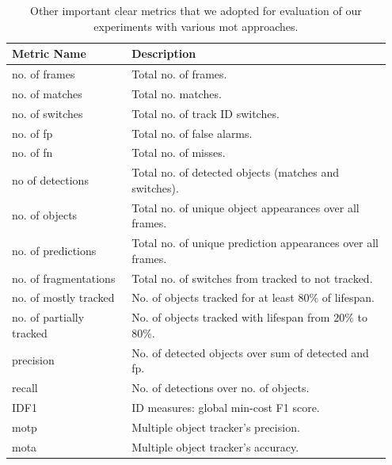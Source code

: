 \begin{table}[t]
    \centering
    \begin{tabular}{p{0.3\linewidth}p{0.65\linewidth}}
        \toprule
        \textbf{Metric Name}     & \textbf{Description}                                        \\
        \midrule
        no. of frames            & Total no. of frames.                                        \\
        no. of matches           & Total no. matches.                                          \\
        no. of switches          & Total no. of track ID switches.                             \\
        no. of \gls{fp}          & Total no. of false alarms.                                  \\
        no. of \gls{fn}          & Total no. of misses.                                        \\
        no of detections         & Total no. of detected objects (matches and switches).       \\
        no. of objects           & Total no. of unique object appearances over all frames.     \\
        no. of predictions       & Total no. of unique prediction appearances over all frames. \\
        no. of fragmentations    & Total no. of switches from tracked to not tracked.          \\
        no. of mostly tracked    & No. of objects tracked for at least $80\%$ of lifespan.     \\
        no. of partially tracked & No. of objects tracked with lifespan from $20\%$ to $80\%$. \\
        precision                & No. of detected objects over sum of detected and \gls{fp}.  \\
        recall                   & No. of detections over no. of objects.                      \\
        IDF1                     & ID measures: global min-cost F1 score.                      \\
        \gls{motp}               & Multiple object tracker's precision.                        \\
        \gls{mota}               & Multiple object tracker's accuracy.                         \\
        \bottomrule
    \end{tabular}
    \caption[Other \gls{mot} metrics]{Other important \gls{clear} metrics that we adopted for evaluation of our experiments with various \gls{mot} approaches.}
    \label{tab:OtherCLEARMetrics}
\end{table}
